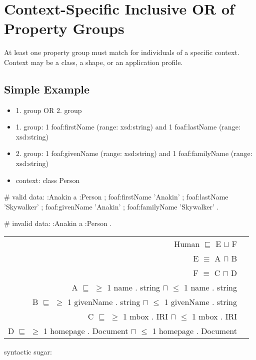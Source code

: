 \documentclass{llncs}
\newenvironment{DL}{
  \vspace{0cm}
	\begin{center}
  \begin{tabular}{r l}

}{
  \end{tabular}
	\end{center}
}
\begin{document}
\section{Context-Specific Inclusive OR of Property Groups}

At least one property group must match for individuals of a specific context. 
Context may be a class, a shape, or an application profile.

\subsection{Simple Example}

\begin{itemize}
  \item 1. group OR 2. group
	\item 1. group: 1 foaf:firstName (range: xsd:string) and 1 foaf:lastName (range: xsd:string)
	\item 2. group: 1 foaf:givenName (range: xsd:string) and 1 foaf:familyName (range: xsd:string)
	\item context: class Person
\end{itemize}

\begin{ex}
# valid data:
:Anakin
    a :Person ;
    foaf:firstName 'Anakin' ;
    foaf:lastName 'Skywalker' ;
    foaf:givenName 'Anakin' ;
    foaf:familyName 'Skywalker' .
\end{ex}

\begin{ex}
# invalid data:
:Anakin
    a :Person .
\end{ex}

\begin{DL}
Human $\sqsubseteq$ E $\sqcup$ F \\ 
E $\equiv$ A $\sqcap$ B \\
F $\equiv$ C $\sqcap$ D \\
A $\sqsubseteq$ $\geq$ 1 name . string $\sqcap$ $\leq$ 1 name . string \\
B $\sqsubseteq$ $\geq$ 1 givenName . string $\sqcap$ $\leq$ 1 givenName . string \\
C $\sqsubseteq$ $\geq$ 1 mbox . IRI $\sqcap$ $\leq$ 1 mbox . IRI \\
D $\sqsubseteq$ $\geq$ 1 homepage . Document $\sqcap$ $\leq$ 1 homepage . Document \\
\end{DL}

syntactic sugar:
\end{document}
